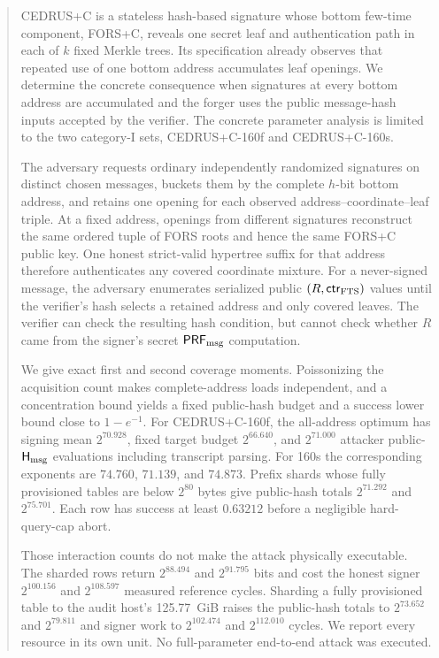 \documentclass[11pt,a4paper]{article}
\newcommand{\PRFmsg}{\ensuremath{\mathsf{PRF}_{\rm msg}}}
\newcommand{\Hmsg}{\ensuremath{\mathsf{H}_{\rm msg}}}
\begin{document}
\begin{abstract}
CEDRUS+C is a stateless hash-based signature whose bottom few-time component,
FORS+C, reveals one secret leaf and authentication path in each of $k$ fixed
Merkle trees.  Its specification already observes that repeated use of one
bottom address accumulates leaf openings.  We determine the concrete
consequence when signatures at every bottom address are accumulated and the
forger uses the public message-hash inputs accepted by the verifier.
The concrete parameter analysis is limited to the two category-I sets,
CEDRUS+C-160f and CEDRUS+C-160s.

The adversary requests ordinary independently randomized signatures on
distinct chosen messages, buckets them by the complete $h$-bit bottom address,
and retains one opening for each observed address--coordinate--leaf triple.
At a fixed address, openings from different signatures reconstruct the same
ordered tuple of FORS roots and hence the same FORS+C public key.  One honest
strict-valid hypertree suffix for that address therefore authenticates any
covered coordinate mixture.  For a never-signed message, the adversary
enumerates serialized public $(R,\mathsf{ctr}_{\rm FTS})$ values until the
verifier's hash selects a retained address and only covered leaves.  The
verifier can check the resulting hash condition, but cannot check whether $R$
came from the signer's secret $\PRFmsg$ computation.

We give exact first and second coverage moments.  Poissonizing the acquisition
count makes complete-address loads independent, and a concentration bound
yields a fixed public-hash budget and a success lower bound close to
$1-e^{-1}$.  For CEDRUS+C-160f, the all-address optimum has signing mean
$2^{70.928}$, fixed target budget $2^{66.640}$, and $2^{71.000}$ attacker
public-$\Hmsg$ evaluations including transcript parsing.  For 160s the
corresponding exponents are $74.760$, $71.139$, and $74.873$.  Prefix shards
whose fully provisioned tables are below $2^{80}$ bytes give public-hash totals
$2^{71.292}$ and $2^{75.701}$.  Each row has success at least $0.63212$ before
a negligible hard-query-cap abort.

Those interaction counts do not make the attack physically executable.  The
sharded rows return $2^{88.494}$ and $2^{91.795}$ bits and cost the honest
signer $2^{100.156}$ and $2^{108.597}$ measured reference cycles.  Sharding a
fully provisioned table to the audit host's 125.77~GiB raises the public-hash
totals to $2^{73.652}$ and $2^{79.811}$ and signer work to $2^{102.474}$ and
$2^{112.010}$ cycles.  We report every resource in its own unit.  No
full-parameter end-to-end attack was executed.


\end{abstract}
\end{document}
